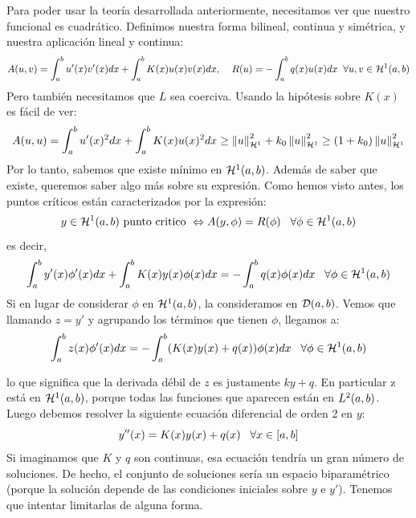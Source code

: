 Para poder usar la teoría desarrollada anteriormente, necesitamos ver que nuestro funcional es cuadrático. Definimos nuestra forma bilineal, continua y simétrica, y nuestra aplicación lineal y continua:
\[
A(u,v)=\integral{a}{b}{u'(x)v'(x)dx}+\integral{a}{b}{K(x)u(x)v(x)dx}, \; \espacio R(u)=-\integral{a}{b}{q(x)u(x)dx} \;\;\forall u,v\in\sobolev{1}
\]
Pero también necesitamos que $L$ sea coerciva. Usando la hipótesis sobre $K(x)$ es fácil de ver:
\[
A(u,u)=\integral{a}{b}{u'(x)^2dx}+\integral{a}{b}{K(x)u(x)^2dx}\geq\normasobolev{1}{u}^2+k_0\normasobolev{1}{u}^2\geq(1+k_0)\normasobolev{1}{u}^2
\]
Por lo tanto, sabemos que existe mínimo en $\sobolev{1}$. Además de saber que existe, queremos saber algo más sobre su expresión. Como hemos visto antes, los puntos críticos están caracterizados por la expresión:
\[
y\in\sobolev{1} \text{ punto critico } \Leftrightarrow A(y,\phi)=R(\phi) \espacio \forall \phi\in\sobolev{1}
\]
es decir,
\[
\integral{a}{b}{y'(x)\phi'(x)dx}+\integral{a}{b}{K(x)y(x)\phi(x)dx}=-\integral{a}{b}{q(x)\phi(x)dx} \espacio  \forall\phi\in\sobolev{1}
\]
Si en lugar de considerar $\phi$ en $\sobolev{1}$, la consideramos en $\soportecompacto$. Vemos que llamando $z=y'$ y agrupando los términos que tienen $\phi$, llegamos a:
\[
\integral{a}{b}{z(x)\phi'(x)dx}=-\integral{a}{b}{(K(x)y(x)+q(x))\phi(x)dx} \espacio  \forall\phi\in\sobolev{1}
\]

lo que significa que la derivada débil de $z$ es justamente $ky+q$. En particular z está en $\sobolev{1}$, porque todas las funciones que aparecen están en $\lebesgue{2}$. Luego debemos resolver la siguiente ecuación diferencial de orden 2 en $y$:
\[
y''(x)=K(x)y(x)+q(x) \espacio \forall x \in[a,b]
\]
Si imaginamos que $K$ y $q$ son continuas, esa ecuación tendría un gran número de soluciones. De hecho, el conjunto de soluciones sería un espacio biparamétrico (porque la solución depende de las condiciones iniciales sobre $y$ e $y'$). Tenemos que intentar limitarlas de alguna forma.

